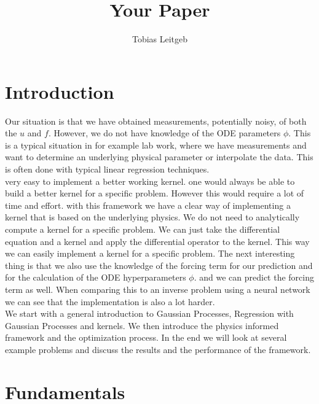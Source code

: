 \documentclass{article}
\title{Your Paper}
\author{Tobias Leitgeb}
\begin{document}
\maketitle

\newpage
\begin{abstract}

\end{abstract}

\section{Introduction}
Our situation is that we have obtained measurements, potentially noisy, of both the $u$ and $f$. However, we do not have knowledge of the ODE parameters
$\phi$. This is a typical situation in for example lab work, where we have
measurements and want to determine an underlying physical parameter or
interpolate the data. This is often done with typical linear regression
techniques.\\ very easy to implement a better working kernel. one would always be able to build a better kernel for a specific problem. However this would require a lot of time and effort. with this framework we have a clear way of implementing a kernel that is based on the underlying physics. We do not need to analytically compute a kernel for a specific problem. We can just take the differential equation and a kernel and apply the differential operator to the kernel. This way we can easily implement a kernel for a specific problem. The next interesting thing is that we also use the knowledge of the forcing term for our prediction and for the calculation of the ODE hyperparameters $\phi$. and we can predict the forcing term as well. When comparing this to an inverse problem using a neural network we can see that the implementation is also a lot harder.\\
We start with a general introduction to Gaussian Processes, Regression with Gaussian Processes and kernels. We
then introduce the physics informed framework and the optimization process. In the end we will look at several example problems and discuss the results and the performance of the framework.\\

\section{Fundamentals}
\end{document}
